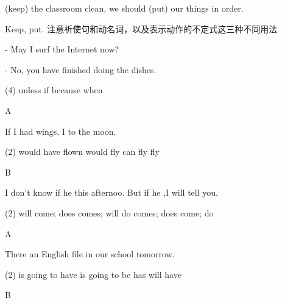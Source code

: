 \begin{question}[tags={xiaoxuect}]
\blank*[width=1.0cm]{}(keep) the classroom clean, we should \blank[width=1cm]{}(put) our things in order.
\end{question}
\begin{solution}
Keep, put. 注意祈使句和动名词，以及表示动作的不定式这三种不同用法
\end{solution}


\begin{question}[tags={xiaoxuect}]
- May I surf the Internet now?

- No, \blank[width=1.0cm]{} you have finished doing the dishes.
  \begin{tasks}(4)
    \task unless
    \task if
    \task because
    \task when
  \end{tasks}

\end{question}
\begin{solution}
A
\end{solution}


\begin{question}[tags={xiaoxuect}]
If I had wings, I \blank[width=1.0cm]{} to the moon.

  \begin{tasks}(2)
    \task would have flown
    \task would fly
    \task can fly
    \task fly
  \end{tasks}

\end{question}
\begin{solution}
B
\end{solution}

\begin{question}[tags={xiaoxuect}]
I don't know if he \blank[width=1.0cm]{} this afternoo. But if he \blank[width=1cm]{},I will tell you.

  \begin{tasks}(2)
    \task will come; does
    \task comes; will do
    \task comes; does
    \task come; do
  \end{tasks}

\end{question}
\begin{solution}
A
\end{solution}

\begin{question}[tags={xiaoxuect}]
There \blank[width=1.0cm]{} an English file in our school tomorrow.

  \begin{tasks}(2)
    \task is going to have
    \task is going to be
    \task has
    \task will have
  \end{tasks}

\end{question}
\begin{solution}
B
\end{solution}

